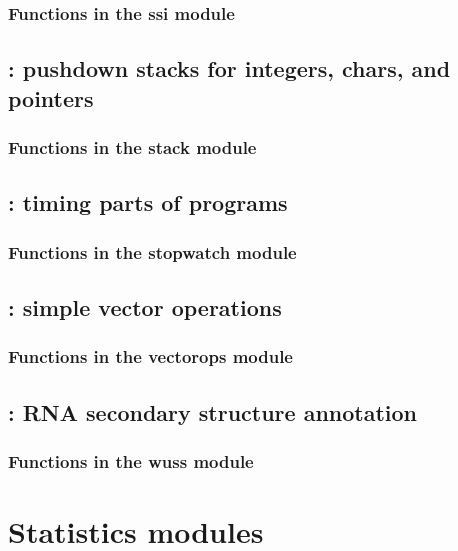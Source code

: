 \documentclass[10pt]{book}
\begin{document}
\subsection{Functions in the ssi module}


\newpage
\section{: pushdown stacks for integers, chars, and pointers}

\subsection{Functions in the stack module}


\newpage
\section{: timing parts of programs}

\subsection{Functions in the stopwatch module}


\newpage
\section{: simple vector operations}

\subsection{Functions in the vectorops module}


\newpage
\section{: RNA secondary structure annotation}

\subsection{Functions in the wuss module}



\newpage
\chapter{Statistics modules}

\end{document}

